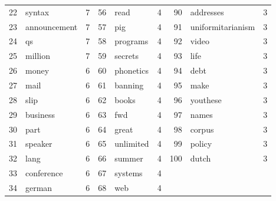 \documentclass[10pt, a4paper]{article}
\begin{document}
\begin{table}[H]
\begin{tabular}{@{}rlrrlrrlr@{}}
22 & syntax & 7 & 56 & read & 4 & 90 & addresses & 3 \\
23 & announcement & 7 & 57 & pig & 4 & 91 & uniformitarianism & 3 \\
24 & qs & 7 & 58 & programs & 4 & 92 & video & 3 \\
25 & million & 7 & 59 & secrets & 4 & 93 & life & 3 \\
26 & money & 6 & 60 & phonetics & 4 & 94 & debt & 3 \\
27 & mail & 6 & 61 & banning & 4 & 95 & make & 3 \\
28 & slip & 6 & 62 & books & 4 & 96 & youthese & 3 \\
29 & business & 6 & 63 & fwd & 4 & 97 & names & 3 \\
30 & part & 6 & 64 & great & 4 & 98 & corpus & 3 \\
31 & speaker & 6 & 65 & unlimited & 4 & 99 & policy & 3 \\
32 & lang & 6 & 66 & summer & 4 & 100 & dutch & 3 \\
33 & conference & 6 & 67 & systems & 4 &  &  &  \\
34 & german & 6 & 68 & web & 4 &  &  &  \\
\bottomrule
\end{tabular}
\label{table:subjcorpus}
\end{table}
\end{document}
